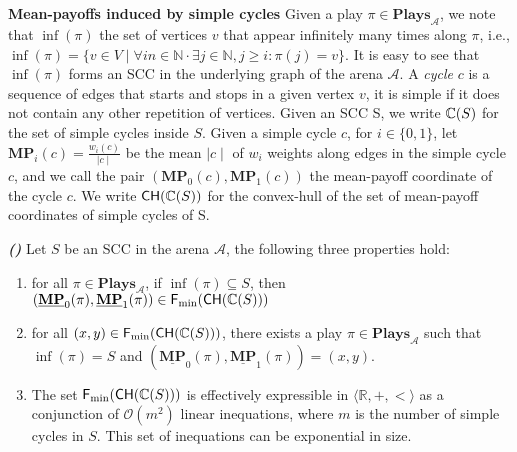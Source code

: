 \\
\\
\textbf{Mean-payoffs induced by simple cycles} Given a play $\pi \in \mathbf{Plays}_{\mathcal{A}}$, we note that $\inf(\pi)$ the set of vertices $v$ that appear infinitely many times along $\pi$, i.e., $\inf(\pi) = \{v \in V \mid \forall in \in \mathbb{N}\cdot \exists j \in \mathbb{N}, j \geqslant i: \pi(j) = v \}$. It is easy to see that $\inf(\pi)$ forms an SCC in the underlying graph of the arena $\mathcal{A}$. A \textit{cycle} $c$ is a sequence of edges that starts and stops in a given vertex $v$, it is simple if it does not contain any other repetition of vertices. Given an SCC S, we write $\mathbb{C}(S)$ for the set of simple cycles inside $S$. Given a simple cycle $c$, for $i \in \{0,1\}$, let $\mathbf{MP}_i(c) = \frac{w_i(c)}{\mid c \mid}$ be the mean $\mid c \mid$ of $w_i$ weights along edges in the simple cycle $c$, and we call the pair $(\mathbf{MP}_0(c), \mathbf{MP}_1(c))$ the mean-payoff coordinate of the cycle $c$. We write ${\sf CH}(\mathbb{C}(S))$ for the convex-hull of the set of mean-payoff coordinates of simple cycles of S.

\begin{lemma}
\label{lemCHToPlay}
\textbf{\emph{(\cite{FGR20,CDEHR10})}} Let $S$ be an SCC in the arena $\mathcal{A}$, the following three properties hold:
\begin{enumerate}
    \item for all $\pi \in \mathbf{Plays}_{\mathcal{A}}$, if $\inf(\pi) \subseteq S$, then $(\underline{\mathbf{MP}}_0(\pi), \underline{\mathbf{MP}}_1(\pi)) \in {\sf F_{\min}}{({\sf CH}(\mathbb{C}(S)))}$
    \item for all $(x,y) \in {\sf F_{\min}}{({\sf CH}(\mathbb{C}(S)))}$, there exists a play $\pi \in \mathbf{Plays}_{\mathcal{A}}$ such that $\inf(\pi) = S$ and $(\underline{\mathbf{MP}}_0(\pi), \underline{\mathbf{MP}}_1(\pi)) = (x,y)$.
    \item The set ${\sf F_{\min}}{({\sf CH}(\mathbb{C}(S)))}$ is effectively expressible in $\langle \mathbb{R}, +, < \rangle$ as a conjunction of $\mathcal{O}(m^2)$ linear inequations, where $m$ is the number of simple cycles in $S$. This set of inequations can be exponential in size.
\end{enumerate}
\end{lemma}


